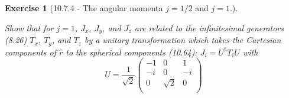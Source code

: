 \documentclass[12pt]{article}
\def\be{\begin{equation}}
\def\ee{\end{equation}}
\def\bea{\begin{eqnarray*}}
\def\f{\frac}
\newtheorem{exercise}{Exercise}
\begin{document}
\begin{exercise}[10.7.4 - The angular momenta $j=1/2$ and $j = 1$.]
\begin{exercises}
			\item Show that for $j = 1$, $J_x$, $J_y$, and $J_z$ are related to the infinitesimal generators (8.26) $T_x$, $T_y$, and $T_z$ by a unitary transformation which takes the Cartesian components of $\hat{r}$ to the spherical
			components (10.64): $J_i = U^\dagger T_i U$ with
			\be
				U = \f{1}{\sqrt{2}}
				\begin{pmatrix}
					-1 & 0 & 1 \\
					-i & 0 & -i \\
					0 & \sqrt{2} & 0 \\
				\end{pmatrix}
			\ee
\end{exercises}
\end{exercise}
\end{document}
